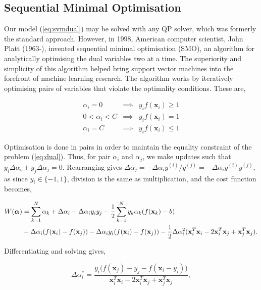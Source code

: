 \documentclass[11pt]{amsart}
\begin{document}
\subsection{Sequential Minimal Optimisation}

Our model (\ref{eq:svmdual}) may be solved with any QP solver, which was formerly the standard approach. However, in 1998, American computer scientist, John Platt (1963-), invented sequential minimal optimisation (SMO), an algorithm for analytically optimising the dual variables two at a time. The superiority and simplicity of this algorithm helped bring support vector machines into the forefront of machine learning research. The algorithm works by iteratively optimising pairs of variables that violate the optimality conditions. These are,

\begin{equation}
\begin{array}{rcl}
\alpha_i = 0 & \implies & y_if(\mathbf{x}_i) \geq 1 \\
0 < \alpha_i < C  & \implies & y_if(\mathbf{x}_i) = 1 \\
\alpha_i = C & \implies & y_if(\mathbf{x}_i) \leq 1
\end{array}
\label{eq:svmkkt}
\end{equation}

Optimisation is done in pairs in order to maintain the equality constraint of the problem (\ref{eq:dual}). Thus, for pair $\alpha_i$ and $\alpha_j$, we make updates such that $y_i\Delta\alpha_i + y_j\Delta\alpha_j = 0$. Rearranging gives $\Delta\alpha_j = -\Delta\alpha_iy^{(i)}/y^{(j)} = -\Delta\alpha_iy^{(i)}y^{(j)}$, as since $y_i \in \{-1, 1\}$, division is the same as multiplication, and the cost function becomes,

\begin{align}
W(\boldsymbol\alpha) &= \sum_{k=1}^N\alpha_k + \Delta\alpha_i -\Delta\alpha_iy_iy_j - \frac{1}{2}\sum_{k=1}^Ny_k\alpha_k(f(\mathbf{x}_k) - b) \notag \\ 
&- \Delta\alpha_i(f(\mathbf{x}_i) - f(\mathbf{x}_j)) - \Delta\alpha_iy_i(f(\mathbf{x}_i) - f(\mathbf{x}_j)) - \frac{1}{2}\Delta\alpha_i^2(\mathbf{x}_i^T\mathbf{x}_i - 2\mathbf{x}_i^T\mathbf{x}_j + \mathbf{x}_j^T\mathbf{x}_j). \notag 
\end{align}

Differentiating and solving gives,

$$\Delta\alpha_i^* = \frac{y_i\big(f(\mathbf{x}_j) - y_j - f(\mathbf{x}_i - y_i)\big)}{\mathbf{x}_i^T\mathbf{x}_i - 2\mathbf{x}_i^T\mathbf{x}_j + \mathbf{x}_j^T\mathbf{x}_j},$$
\end{document}
